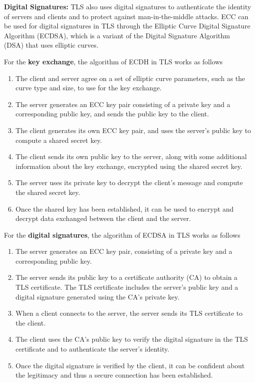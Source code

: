 \noindent\textbf{Digital Signatures:} TLS also uses digital signatures to authenticate the identity of servers and clients and to protect against man-in-the-middle attacks. ECC can be used for digital signatures in TLS through the Elliptic Curve Digital Signature Algorithm (ECDSA), which is a variant of the Digital Signature Algorithm (DSA) that uses elliptic curves.

\newpage
\noindent For the \textbf{key exchange}, the algorithm of ECDH in TLS works as follows
\begin{enumerate}
    \item The client and server agree on a set of elliptic curve parameters, such as the curve type and size, to use for the key exchange.
    \item The server generates an ECC key pair consisting of a private key and a corresponding public key, and sends the public key to the client.
    \item The client generates its own ECC key pair, and uses the server's public key to compute a shared secret key.
    \item The client sends its own public key to the server, along with some additional information about the key exchange, encrypted using the shared secret key.
    \item The server uses its private key to decrypt the client's message and compute the shared secret key.
    \item Once the shared key has been established, it can be used to encrypt and decrypt data exchanged between the client and the server.
\end{enumerate}
\par
\noindent For the \textbf{digital signatures}, the algorithm of ECDSA in TLS works as follows
\begin{enumerate}
    \item The server generates an ECC key pair, consisting of a private key and a corresponding public key.
    \item The server sends its public key to a certificate authority (CA) to obtain a TLS certificate. The TLS certificate includes the server's public key and a digital signature generated using the CA's private key.
    \item When a client connects to the server, the server sends its TLS certificate to the client.
    \item The client uses the CA's public key to verify the digital signature in the TLS certificate and to authenticate the server's identity.
    \item Once the digital signature is verified by the client, it can be confident about the legitimacy and thus a secure connection has been established.
\end{enumerate}


